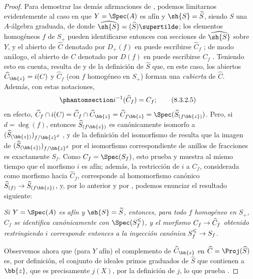 \documentclass[oneside,10pt]{amsart}
\makeatletter
\renewcommand{\leq}{\leqslant}
\newcommand{\ega@arrow}[2]{\mathchoice{#1}{#2}{#2}{#2}}
\renewcommand{\to}{\ega@arrow{\longrightarrow}{\rightarrow}}
\newcommand{\oldpage}[2][]{\marginnote{\normalfont\footnotesize\textbf{#1}~|~#2}\ignorespaces}
\let\EGAOriginalLabel\label
\renewcommand{\label}[1]{\phantomsection\EGAOriginalLabel{#1}}
\makeatother
\begin{document}
\begin{proof}
Para demostrar las demás afirmaciones de , podemos limitarnos evidentemente al caso en que $Y=\Spec(A)$ es afín y $\sh{S}=\widetilde{S}$, siendo $S$ una $A$-álgebra graduada, de donde $\widehat{\sh{S}}=(\widehat{S})\supertilde$;
los elementos homogéneos $f$ de $S_+$ pueden identificarse entonces con secciones de $\widehat{\sh{S}}$ sobre $Y$, y el abierto de $\widehat{C}$ denotado por $D_+(f)$ en  puede escribirse $\widehat{C}_f$ ;
de modo análogo, el abierto de $C$ denotado por $D(f)$ en  puede escribirse $C_f$ .
Teniendo esto en cuenta, resulta de  y de la definición de $\widehat{S}$ que, en este caso, los abiertos $\widehat{C}_{\bb{z}}=i(C)$ y $\widehat{C}_f$ (con $f$ homogéneo en $S_+$) forman una \emph{cubierta} de $\widehat{C}$.
Además, con estas notaciones,
\[
\label{II.8.3.2.5}
  i^{-1}(\widehat{C}_f) = C_f;
\tag{8.3.2.5}
\]
en efecto, $\widehat{C}_f\cap i(C) = \widehat{C}_f\cap\widehat{C}_{\bb{z}} = \widehat{C}_{f\bb{z}} = \Spec(\widehat{S}_{(f\bb{z})})$.
Pero, si $d=\deg(f)$, entonces $\widehat{S}_{(f\bb{z})}$ es canónicamente isomorfo a $(\widehat{S}_{(\bb{z})})_{f/\bb{z}^d}$ , y de la definición del isomorfismo de  resulta que la imagen de $(\widehat{S}_{(\bb{z})})_{f/\bb{z}^d}$ por el isomorfismo correspondiente de anillos de fracciones es exactamente $S_f$.
Como $C_f=\Spec(S_f)$, esto prueba  y muestra al mismo tiempo que el morfismo $i$ es afín;
además, la restricción de $i$ a $C_f$, considerada como morfismo hacia $\widehat{C}_f$, corresponde  al homomorfismo canónico $\widehat{S}_{(f)}\to\widehat{S}_{(f\bb{z})}$, y, por lo anterior y por , podemos enunciar el resultado siguiente:
\begin{env}[8.3.2.6]
\label{II.8.3.2.6}
\emph{Si $Y=\Spec(A)$ es afín y $\sh{S}=\widetilde{S}$, entonces, para todo $f$ homogéneo en $S_+$, $\widehat{C}_f$ se identifica canónicamente con $\Spec(S_f^\leq)$, y el morfismo $C_f\to\widehat{C}_f$ obtenido restringiendo $i$ corresponde entonces a la inyección canónica $S_f^\leq\to S_f$}.
\end{env}

Observemos ahora que (para $Y$ afín) el complemento de $\widehat{C}_{\bb{z}}$ en $\widehat{C}=\Proj(\widehat{S})$
\oldpage[II]{164}
es, por definición, el conjunto de ideales primos graduados de $\widehat{S}$ que contienen a $\bb{z}$, que es precisamente $j(X)$, por la definición de $j$, lo que prueba .


\end{proof}
\end{document}
